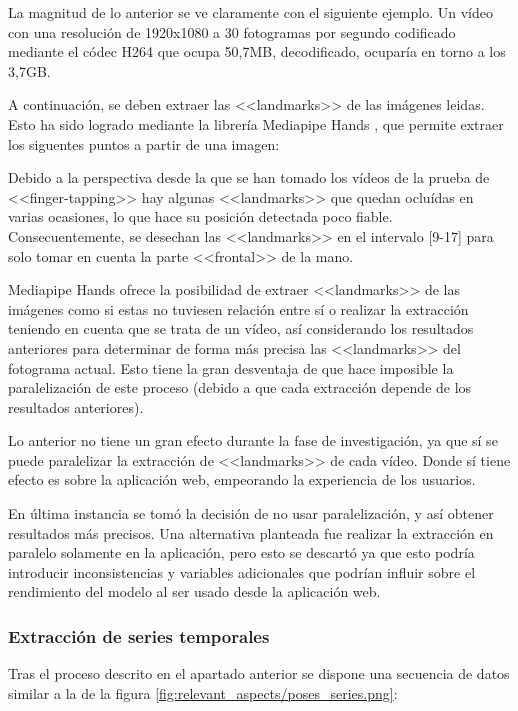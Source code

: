 La magnitud de lo anterior se ve claramente con el siguiente ejemplo. Un vídeo
con una resolución de 1920x1080 a 30 fotogramas por segundo codificado mediante
el códec H264 que ocupa 50,7MB, decodificado, ocuparía en torno a los 3,7GB.

A continuación, se deben extraer las <<landmarks>> de las imágenes leidas. Esto
ha sido logrado mediante la librería Mediapipe Hands \cite{zhang2020mediapipe},
que permite extraer los siguentes puntos a partir de una imagen:


Debido a la perspectiva desde la que se han tomado los vídeos de la prueba de
<<finger-tapping>> hay algunas <<landmarks>> que quedan ocluídas en varias
ocasiones, lo que hace su posición detectada poco fiable. Consecuentemente, se
desechan las <<landmarks>> en el intervalo [9-17] para solo tomar en cuenta la
parte <<frontal>> de la mano.

Mediapipe Hands ofrece la posibilidad de extraer <<landmarks>> de las imágenes
como si estas no tuviesen relación entre sí o realizar la extracción teniendo en
cuenta que se trata de un vídeo, así considerando los resultados anteriores para
determinar de forma más precisa las <<landmarks>> del fotograma actual. Esto
tiene la gran desventaja de que hace imposible la paralelización de este proceso
(debido a que cada extracción depende de los resultados anteriores).

Lo anterior no tiene un gran efecto durante la fase de investigación, ya que sí
se puede paralelizar la extracción de <<landmarks>> de cada vídeo. Donde sí
tiene efecto es sobre la aplicación web, empeorando la experiencia de los
usuarios.

En última instancia se tomó la decisión de no usar paralelización, y así obtener
resultados más precisos. Una alternativa planteada fue realizar la extracción en
paralelo solamente en la aplicación, pero esto se descartó ya que esto podría
introducir inconsistencias y variables adicionales que podrían influir sobre el
rendimiento del modelo al ser usado desde la aplicación web.

\subsubsection{Extracción de series temporales}

Tras el proceso descrito en el apartado anterior se dispone una secuencia de
datos similar a la de la figura \ref{fig:relevant_aspects/poses_series.png}:

